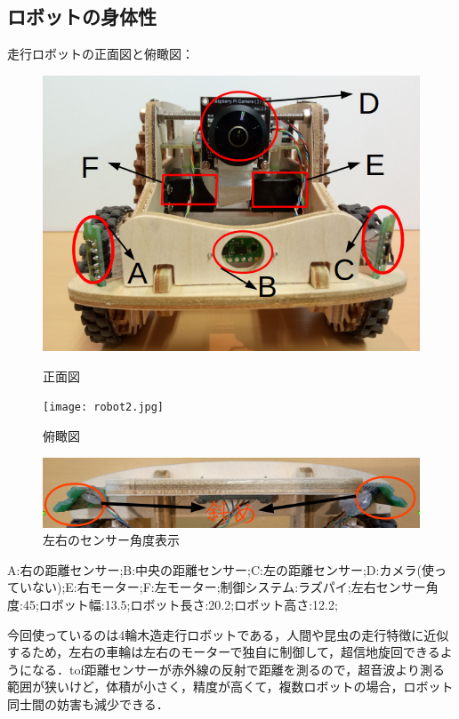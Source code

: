 \documentclass[twocolumn]{jarticle} %
\begin{document}
\subsection{ロボットの身体性}
走行ロボットの正面図と俯瞰図：
\begin{figure}[h]
    \begin{minipage}{0.48\linewidth}
        \centering
        \includegraphics[width=0.9\linewidth]{robot1.jpg}
        \caption{正面図}
    \end{minipage}
    \begin{minipage}{0.48\linewidth}
        \centering
        \texttt{[image: robot2.jpg]}
        \caption{俯瞰図}
    \end{minipage}
\end{figure}
\vspace{-5mm}
\begin{figure}[h]
        \centering
        \includegraphics[width=1.0\linewidth]{robot4.jpg}
        \caption{左右のセンサー角度表示}
\end{figure}


A:右の距離センサー;B:中央の距離センサー;C:左の距離センサー;D:カメラ(使っていない);E:右モーター;F:左モーター;制御システム:ラズパイ;左右センサー角度:45\degree;ロボット幅:13.5;ロボット長さ:20.2;ロボット高さ:12.2;



今回使っているのは4輪木造走行ロボットである，人間や昆虫の走行特徴に近似するため，左右の車輪は左右のモーターで独自に制御して，超信地旋回できるようになる．tof距離センサーが赤外線の反射で距離を測るので，超音波より測る範囲が狭いけど，体積が小さく，精度が高くて，複数ロボットの場合，ロボット同士間の妨害も減少できる．
\end{document}

